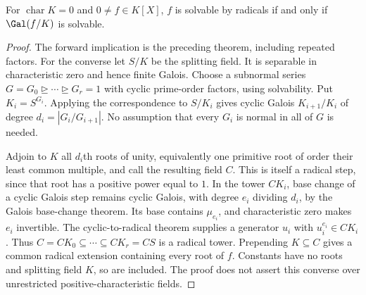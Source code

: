 \begin{theorem}
For $\operatorname{char}K=0$ and $0\ne f\in K[X]$, $f$ is solvable by radicals if and only if $\Gal(f/K)$ is solvable.
\end{theorem}
\begin{proof}
The forward implication is the preceding theorem, including repeated factors. For the converse let $S/K$ be the splitting field. It is separable in characteristic zero and hence finite Galois. Choose a subnormal series $G=G_0\trianglerighteq\cdots\trianglerighteq G_r=1$ with cyclic prime-order factors, using solvability. Put $K_i=S^{G_i}$. Applying the correspondence to $S/K_i$ gives cyclic Galois $K_{i+1}/K_i$ of degree $d_i=|G_i/G_{i+1}|$. No assumption that every $G_i$ is normal in all of $G$ is needed.

Adjoin to $K$ all $d_i$th roots of unity, equivalently one primitive root of order their least common multiple, and call the resulting field $C$. This is itself a radical step, since that root has a positive power equal to $1$. In the tower $CK_i$, base change of a cyclic Galois step remains cyclic Galois, with degree $e_i$ dividing $d_i$, by the Galois base-change theorem. Its base contains $\mu_{e_i}$, and characteristic zero makes $e_i$ invertible. The cyclic-to-radical theorem supplies a generator $u_i$ with $u_i^{e_i}\in CK_i$. Thus $C=CK_0\subseteq\cdots\subseteq CK_r=CS$ is a radical tower. Prepending $K\subseteq C$ gives a common radical extension containing every root of $f$. Constants have no roots and splitting field $K$, so are included. The proof does not assert this converse over unrestricted positive-characteristic fields.
\end{proof}

